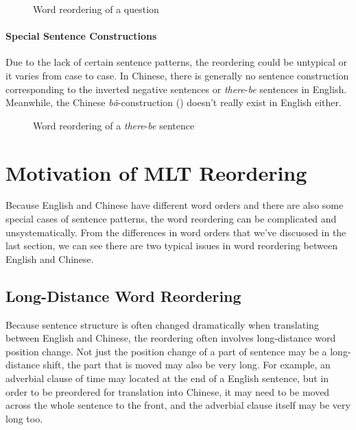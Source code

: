 \begin{figure}[H]
\centering

\caption{Word reordering of a question}
\label{question}
\end{figure}

\paragraph{Special Sentence Constructions}
Due to the lack of certain sentence patterns, the reordering could be untypical or it varies from case to case. In Chinese, there is generally no sentence construction corresponding to the inverted negative sentences or \emph{there}-\emph{be} sentences in English. Meanwhile, the Chinese \emph{bǎ}-construction () doesn't really exist in English either.

\begin{figure}[H]
\centering

\caption{Word reordering of a \emph{there}-\emph{be} sentence}
\end{figure}

\section{Motivation of \acf{MLT} Reordering}
\label{ch:ReorderingApproach:sec:Motivation}

Because English and Chinese have different word orders and there are also some special cases of sentence patterns, the word reordering can be complicated and unsystematically. From the differences in word orders that we've discussed in the last section, we can see there are two typical issues in word reordering between English and Chinese.

\subsection{Long-Distance Word Reordering}

Because sentence structure is often changed dramatically when translating between English and Chinese, the reordering often involves long-distance word position change. Not just the position change of a part of sentence may be a long-distance shift, the part that is moved may also be very long. For example, an adverbial clause of time may located at the end of a English sentence, but in order to be preordered for translation into Chinese, it may need to be moved across the whole sentence to the front, and the adverbial clause itself may be very long too. 

